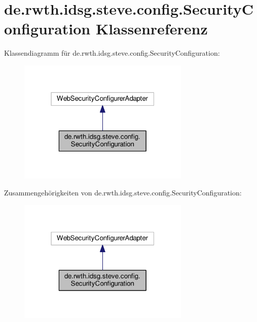\hypertarget{classde_1_1rwth_1_1idsg_1_1steve_1_1config_1_1_security_configuration}{\section{de.\-rwth.\-idsg.\-steve.\-config.\-Security\-Configuration Klassenreferenz}
\label{classde_1_1rwth_1_1idsg_1_1steve_1_1config_1_1_security_configuration}
}


Klassendiagramm für de.\-rwth.\-idsg.\-steve.\-config.\-Security\-Configuration\-:\nopagebreak
\begin{figure}[H]
\begin{center}
\leavevmode
\includegraphics[width=232pt]{classde_1_1rwth_1_1idsg_1_1steve_1_1config_1_1_security_configuration__inherit__graph}
\end{center}
\end{figure}


Zusammengehörigkeiten von de.\-rwth.\-idsg.\-steve.\-config.\-Security\-Configuration\-:\nopagebreak
\begin{figure}[H]
\begin{center}
\leavevmode
\includegraphics[width=232pt]{classde_1_1rwth_1_1idsg_1_1steve_1_1config_1_1_security_configuration__coll__graph}
\end{center}
\end{figure}

